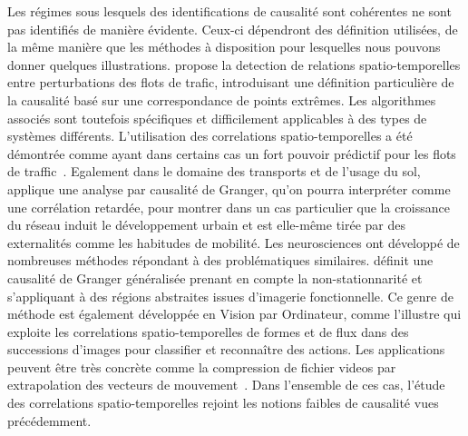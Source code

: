 \documentclass[french]{./sageo}
\begin{document}
Les régimes sous lesquels des identifications de causalité sont cohérentes ne sont pas identifiés de manière évidente. Ceux-ci dépendront des définition utilisées, de la même manière que les méthodes à disposition pour lesquelles nous pouvons donner quelques illustrations. \cite{liu2011discovering} propose la detection de relations spatio-temporelles entre perturbations des flots de trafic, introduisant une définition particulière de la causalité basé sur une correspondance de points extrêmes. Les algorithmes associés sont toutefois spécifiques et difficilement applicables à des types de systèmes différents. L'utilisation des correlations spatio-temporelles a été démontrée comme ayant dans certains cas un fort pouvoir prédictif pour les flots de traffic~\cite{min2011real}. Egalement dans le domaine des transports et de l'usage du sol, \cite{xie2009streetcars} applique une analyse par causalité de Granger, qu'on pourra interpréter comme une corrélation retardée, pour montrer dans un cas particulier que la croissance du réseau induit le développement urbain et est elle-même tirée par des externalités comme les habitudes de mobilité. Les neurosciences ont développé de nombreuses méthodes répondant à des problématiques similaires. \cite{luo2013spatio} définit une causalité de Granger généralisée prenant en compte la non-stationnarité et s'appliquant à des régions abstraites issues d'imagerie fonctionnelle. Ce genre de méthode est également développée en Vision par Ordinateur, comme l'illustre \cite{ke2007spatio} qui exploite les correlations spatio-temporelles de formes et de flux dans des successions d'images pour classifier et reconnaître des actions. Les applications peuvent être très concrète comme la compression de fichier videos par extrapolation des vecteurs de mouvement~\cite{chalidabhongse1997fast}. Dans l'ensemble de ces cas, l'étude des correlations spatio-temporelles rejoint les notions faibles de causalité vues précédemment.
\end{document}
